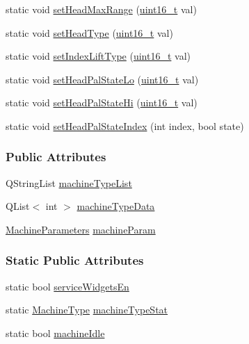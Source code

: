 \begin{DoxyCompactItemize}
static void \mbox{\hyperlink{classMachineSettings_a5ec4d87fc0832c6b79d5229085237252}{set\+Head\+Max\+Range}} (\mbox{\hyperlink{settings_8h_a017dd44e68049ffdd31500a8cd01ba68}{uint16\+\_\+t}} val)
\item 
static void \mbox{\hyperlink{classMachineSettings_a33f6697feb74cab98d582f80bd4dd6a2}{set\+Head\+Type}} (\mbox{\hyperlink{settings_8h_a017dd44e68049ffdd31500a8cd01ba68}{uint16\+\_\+t}} val)
\item 
static void \mbox{\hyperlink{classMachineSettings_a546ae7011ac82ecf38125c2ba534d327}{set\+Index\+Lift\+Type}} (\mbox{\hyperlink{settings_8h_a017dd44e68049ffdd31500a8cd01ba68}{uint16\+\_\+t}} val)
\item 
static void \mbox{\hyperlink{classMachineSettings_ad1db42477cae871db33526bf828dd6a7}{set\+Head\+Pal\+State\+Lo}} (\mbox{\hyperlink{settings_8h_a017dd44e68049ffdd31500a8cd01ba68}{uint16\+\_\+t}} val)
\item 
static void \mbox{\hyperlink{classMachineSettings_a8b1fe308c75ea1bafd283e0f97b87a93}{set\+Head\+Pal\+State\+Hi}} (\mbox{\hyperlink{settings_8h_a017dd44e68049ffdd31500a8cd01ba68}{uint16\+\_\+t}} val)
\item 
static void \mbox{\hyperlink{classMachineSettings_aa568893fe06e0bc946dc7ceb33535aaa}{set\+Head\+Pal\+State\+Index}} (int index, bool state)
\end{DoxyCompactItemize}
\subsubsection*{Public Attributes}
\begin{DoxyCompactItemize}
\item 
Q\+String\+List \mbox{\hyperlink{classMachineSettings_ad0e371856a610c685f0cde9f9cb2b5c5}{machine\+Type\+List}}
\item 
Q\+List$<$ int $>$ \mbox{\hyperlink{classMachineSettings_abe0a0868f7081db78076e61fd8793384}{machine\+Type\+Data}}
\item 
\mbox{\hyperlink{classMachineSettings_a87879e13793dbc7c10d4fa18e1236751}{Machine\+Parameters}} \mbox{\hyperlink{classMachineSettings_abca1961654d6dd586ec26990e5d49ed7}{machine\+Param}}
\end{DoxyCompactItemize}
\subsubsection*{Static Public Attributes}
\begin{DoxyCompactItemize}
\item 
static bool \mbox{\hyperlink{classMachineSettings_a9a8e6bc0e09fa8ac8e32e30cbbd5ef4c}{service\+Widgets\+En}}
\item 
static \mbox{\hyperlink{classMachineSettings_af95330ff3a80de06fe956f5297ec0fc5}{Machine\+Type}} \mbox{\hyperlink{classMachineSettings_ae3167629c7a8723b123ff5616fb284af}{machine\+Type\+Stat}}
\item 
static bool \mbox{\hyperlink{classMachineSettings_a8297d5ccf01292708bc4aae65180a54c}{machine\+Idle}}
\end{DoxyCompactItemize}
